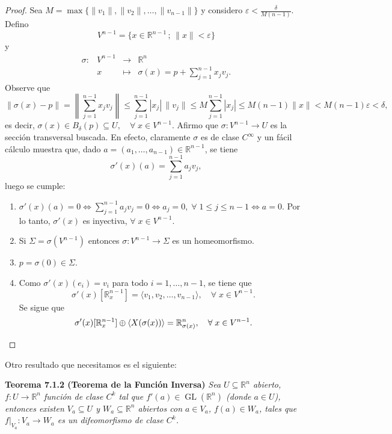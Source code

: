 \documentclass[11pt,a4paper]{article}
\theoremstyle{definition}
\theoremstyle{plain}
\theoremstyle{remark}
\newcommand{\restr}[2]{\left.#1\right|_{#2}}
\begin{document}
\begin{proof}
		Sea $M = \max\{\|v_1\|, \|v_2\|, \dots, \|v_{n-1}\|\}$ y considero $\varepsilon < \frac{\delta}{M(n-1)}$. Defino
		\[
		V^{n-1} = \{x \in \mathbb{R}^{n-1} \,;\, \|x\| < \varepsilon\}
		\]
		y
		\[
		\begin{array}{rccc}
			\sigma : & V^{n-1} & \to & \mathbb{R}^n \\
			& x & \mapsto & \sigma(x) = p + \displaystyle\sum_{j=1}^{n-1} x_j v_j.
		\end{array}
		\]
		Observe que
		\[
		\|\sigma(x) - p\| = \left\| \sum_{j=1}^{n-1} x_j v_j \right\| \le \sum_{j=1}^{n-1} |x_j| \, \|v_j\| \le M \sum_{j=1}^{n-1} |x_j| \le M(n-1)\|x\| < M(n-1)\varepsilon < \delta,
		\]
		es decir, $\sigma(x) \in B_\delta(p) \subseteq U, \quad \forall \; x \in V^{n-1}$. Afirmo que $\sigma : V^{n-1} \to U$ es la sección transversal buscada. En efecto, claramente $\sigma$ es de clase $C^\infty$ y un fácil cálculo muestra que, dado $a = (a_1, \dots, a_{n-1}) \in \mathbb{R}^{n-1}$, se tiene
		\[
		\sigma'(x)(a) = \sum_{j=1}^{n-1} a_j v_j,
		\]
		luego se cumple:
		\begin{enumerate}[label=\roman*)]
			\item $\sigma'(x)(a) = 0 \iff \sum_{j=1}^{n-1} a_j v_j = 0 \iff a_j = 0, \; \forall \; 1 \le j \le n-1 \iff a = 0$. Por lo tanto, $\sigma'(x)$ es inyectiva, $\forall \; x \in V^{n-1}$.
			\item Si $\Sigma = \sigma(V^{n-1})$ entonces $\sigma : V^{n-1} \to \Sigma$ es un homeomorfismo.
			\item $p = \sigma(0) \in \Sigma$.
			\item Como $\sigma'(x)(e_i) = v_i$ para todo $i = 1, \dots, n-1$, se tiene que
			\[
			\sigma'(x)[\mathbb{R}^{n-1}_x] = \langle v_1, v_2, \dots, v_{n-1} \rangle, \quad \forall \; x \in V^{n-1}.
			\]
			Se sigue que
			\[
			\sigma'(x)[\mathbb{R}^{n-1}_x] \oplus \langle X(\sigma(x)) \rangle = \mathbb{R}^n_{\sigma(x)}, \quad \forall \; x \in V^{n-1}. \qedhere
			\]
		\end{enumerate}
	\end{proof}
	
	Otro resultado que necesitamos es el siguiente:
	
	\noindent \textbf{Teorema 7.1.2 (Teorema de la Función Inversa)} \textit{Sea $U \subseteq \mathbb{R}^n$ abierto, $f : U \to \mathbb{R}^n$ función de clase $C^k$ tal que $f'(a) \in \operatorname{GL}(\mathbb{R}^n)$ (donde $a \in U$), entonces existen $V_a \subseteq U$ y $W_a \subseteq \mathbb{R}^n$ abiertos con $a \in V_a$, $f(a) \in W_a$, tales que $\restr{f}{V_a} : V_a \to W_a$ es un difeomorfismo de clase $C^k$.}
	
\end{document}
